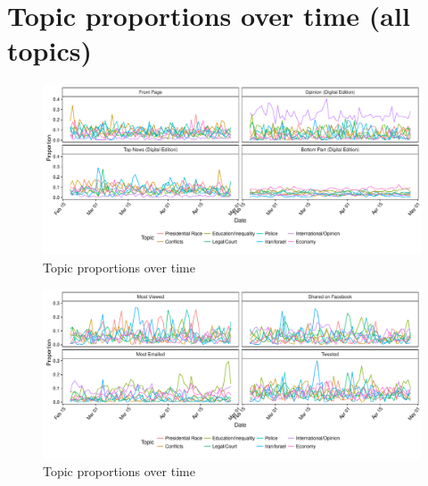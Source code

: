 \documentclass[12pt]{article}
\begin{document}
\clearpage
\section{Topic proportions over time (all topics)}

\begin{figure}[h]
\caption{Topic proportions over time}\label{fig:series_nyt}
\includegraphics[width=\textwidth]{../calc/fig/series_nyt} 
\end{figure}

\begin{figure}[h]
\caption{Topic proportions over time}\label{fig:series_share}
\includegraphics[width=\textwidth]{../calc/fig/series_share} 
\end{figure}
\end{document}
